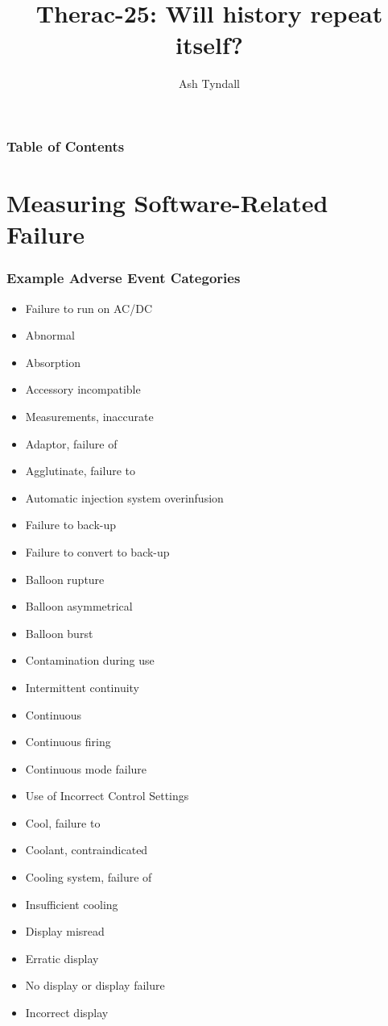 \documentclass{beamer}
\title{Therac-25: Will history repeat itself?}
\author{Ash Tyndall}
\begin{document}
  \frame{\titlepage}

  \begin{frame}
  \frametitle{Table of Contents}
  \tableofcontents
  \end{frame}
  
  \section{Measuring Software-Related Failure}
  
  \begin{frame}
  \frametitle{Example Adverse Event Categories}
    \tiny
  \begin{multicols}{4}
    \begin{itemize}
  \item Failure to run on AC/DC
  \item Abnormal
  \item Absorption
  \item Accessory incompatible
  \item Measurements, inaccurate
  \item Adaptor, failure of
  \item Agglutinate, failure to
  \item Automatic injection system overinfusion
  \item Failure to back-up
  \item Failure to convert to back-up
  \item Balloon rupture
  \item Balloon asymmetrical
  \item Balloon burst
  \item Contamination during use
  \item Intermittent continuity
  \item Continuous
  \item Continuous firing
  \item Continuous mode failure
  \item Use of Incorrect Control Settings
  \item Cool, failure to
  \item Coolant, contraindicated
  \item Cooling system, failure of
  \item Insufficient cooling
  \item Display misread
  \item Erratic display
  \item No display or display failure
  \item Incorrect display

\end{itemize}
\end{multicols}
\end{frame}
\end{document}
